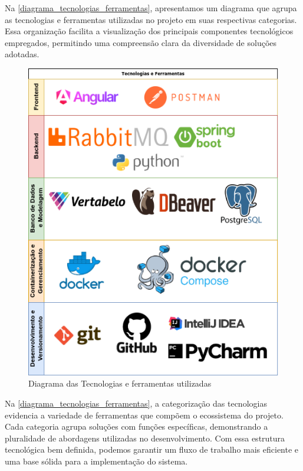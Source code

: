 \documentclass[
	12pt,				%
	oneside,			%
	a4paper,			%
	english,			%
	french,				%
	spanish,			%
	brazil				%
	]{abntex2}
\begin{document}
Na \autoref{diagrama_tecnologias_ferramentas}, apresentamos um diagrama
que agrupa as tecnologias e ferramentas utilizadas no projeto em suas
respectivas categorias. Essa organização facilita a visualização dos
principais componentes tecnológicos empregados, permitindo uma
compreensão clara da diversidade de soluções adotadas.

\begin{figure}[htbp]
\hypertarget{diagrama_tecnologias_ferramentas}{%
\caption{Diagrama das Tecnologias e ferramentas utilizadas}\label{diagrama_tecnologias_ferramentas}
\begin{center}
\includegraphics[scale=0.5]{imagens/sentilytics/diagramas/tecnologias-ferramentas.png}
\end{center}
}
\end{figure}

Na \autoref{diagrama_tecnologias_ferramentas}, a categorização das
tecnologias evidencia a variedade de ferramentas que compõem o
ecossistema do projeto. Cada categoria agrupa soluções com funções
específicas, demonstrando a pluralidade de abordagens utilizadas no
desenvolvimento. Com essa estrutura tecnológica bem definida, podemos
garantir um fluxo de trabalho mais eficiente e uma base sólida para a
implementação do sistema.
\end{document}
